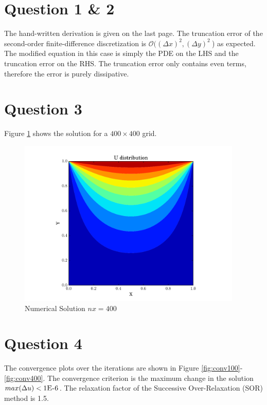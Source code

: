 \documentclass[letterpaper,12pt,]{article}
\begin{document}


\section*{Question 1 \& 2}

The hand-written derivation is given on the last page.
The truncation error of the second-order finite-difference discretization is $\mathcal{O}((\Delta x)^2, (\Delta y)^2\ $) as expected. 
The modified equation in this case is simply the PDE on the LHS and the truncation error on the RHS.
The truncation error only contains even terms, therefore the error is purely dissipative.


\section*{Question 3}

Figure \ref{fig:u400} shows the solution for a $400 \times 400$ grid.

\begin{figure}[!h]
    \centering
    \includegraphics[width = 0.95\textwidth]{./Figures/U400.pdf}
    \caption{Numerical Solution $nx = 400$}
    \label{fig:u400}
\end{figure}


\newpage
\section*{Question 4}

The convergence plots over the iterations are shown in Figure \ref{fig:conv100}-\ref{fig:conv400}.
The convergence criterion is the maximum change in the solution $max(\Delta u) < 1\textsc{E-}6$.
The relaxation factor of the Successive Over-Relaxation (SOR) method is 1.5.
\end{document}
